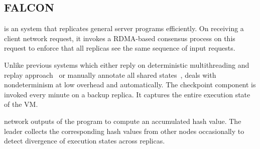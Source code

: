 \subsection{FALCON} \label{sec:falcon}

\smrsystem is an \smr system that replicates general server programs efficiently. On 
receiving a client network request, it invokes a RDMA-based consensus process on this 
request to enforce that all replicas see the same sequence of input requests. 

Unlike previous \smr systems which either reply on deterministic multithreading and replay
approach~\cite{rex:eurosys14} or manually annotate all shared states~\cite{eve:osdi12}, 
\smrsystem deals with nondeterminism at low overhead and automatically. 
The checkpoint 
component is invoked every minute on a backup replica. It captures the entire execution state 
of the VM. 

network outputs of the program to compute an accumulated hash value. The leader collects 
the corresponding hash values from other nodes occasionally to detect divergence of execution 
states across replicas.
